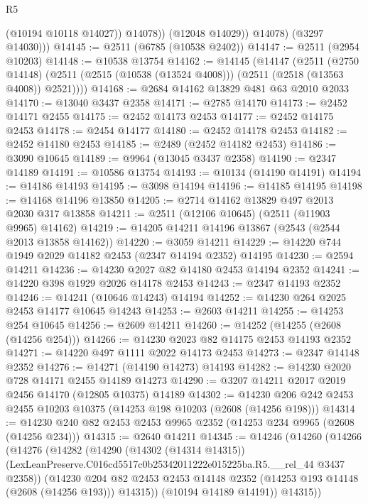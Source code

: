 \begin{lexlean}{R5}
\begin{coremodule}
                  (@10194 @10118 @14027))
                @14078))
            (@12048 @14029))
          @14078)
        (@3297 @14030)))
@14145 := @2511 (@6785 (@10538 @2402))
@14147 := @2511 (@2954 @10203)
@14148 := @10538 @13754
@14162 := @14145
    (@14147
      (@2511
        (@2750 @14148)
        (@2511 (@2515 (@10538 (@13524 @4008))) (@2511 (@2518 (@13563 @4008)) @2521))))
@14168 := @2684 @14162 @13829 @481 @63 @2010 @2033
@14170 := @13040 @3437 @2358
@14171 := @2785 @14170
@14173 := @2452 @14171 @2455
@14175 := @2452 @14173 @2453
@14177 := @2452 @14175 @2453
@14178 := @2454 @14177
@14180 := @2452 @14178 @2453
@14182 := @2452 @14180 @2453
@14185 := @2489 (@2452 @14182 @2453)
@14186 := @3090 @10645
@14189 := @9964 (@13045 @3437 @2358)
@14190 := @2347 @14189
@14191 := @10586 @13754
@14193 := @10134 (@14190 @14191)
@14194 := @14186 @14193
@14195 := @3098 @14194
@14196 := @14185 @14195
@14198 := @14168 @14196 @13850
@14205 := @2714 @14162 @13829 @497 @2013 @2030 @317 @13858
@14211 := @2511 (@12106 @10645) (@2511 (@11903 @9965) @14162)
@14219 := @14205 @14211 @14196 @13867 (@2543 (@2544 @2013 @13858 @14162))
@14220 := @3059 @14211
@14229 := @14220 @744 @1949 @2029 @14182 @2453 (@2347 @14194 @2352) @14195
@14230 := @2594 @14211
@14236 := @14230 @2027 @82 @14180 @2453 @14194 @2352
@14241 := @14220 @398 @1929 @2026 @14178 @2453
@14243 := @2347 @14193 @2352
@14246 := @14241 (@10646 @14243) @14194
@14252 := @14230 @264 @2025 @2453 @14177 @10645 @14243
@14253 := @2603 @14211
@14255 := @14253 @254 @10645
@14256 := @2609 @14211
@14260 := @14252 (@14255 (@2608 (@14256 @254)))
@14266 := @14230 @2023 @82 @14175 @2453 @14193 @2352
@14271 := @14220 @497 @1111 @2022 @14173 @2453
@14273 := @2347 @14148 @2352
@14276 := @14271 (@14190 @14273) @14193
@14282 := @14230 @2020 @728 @14171 @2455 @14189 @14273
@14290 := @3207 @14211 @2017 @2019 @2456 @14170 (@12805 @10375) @14189
@14302 := @14230 @206 @242 @2453 @2455 @10203 @10375 (@14253 @198 @10203 (@2608 (@14256 @198)))
@14314 := @14230 @240 @82 @2453 @2453 @9965 @2352 (@14253 @234 @9965 (@2608 (@14256 @234)))
@14315 := @2640 @14211
@14345 := @14246
    (@14260
      (@14266
        (@14276
          (@14282
            (@14290
              (@14302 (@14314 @14315))
              (LexLeanPreserve.C016cd5517c0b25342011222e015225ba.R5.__rel_44 @3437 @2358))
            (@14230
              @204
              @82
              @2453
              @2453
              @14148
              @2352
              (@14253 @193 @14148 (@2608 (@14256 @193)))
              @14315))
          (@10194 @14189 @14191))
        @14315))

\end{coremodule}
\end{lexlean}
